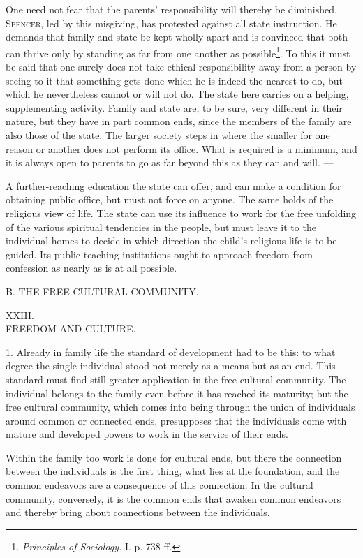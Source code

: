 \documentclass[12pt,a4paper,openany]{book}
\newcommand{\opage}[1]{\marginnote{\footnotesize\textit{[#1]}}}
\newcommand{\grouphead}[1]{\bigskip\begin{center}{\large #1}\end{center}}
\newcounter{etikch}
\newcommand{\chapterhead}[2]{\stepcounter{etikch}\bigskip\begin{center}\pdfbookmark[1]{#1 #2}{etikch.\arabic{etikch}}#1\\[3pt]{\large #2}\end{center}\medskip}
\begin{document}
One need not fear that the parents' responsibility will thereby be diminished. \textsc{Spencer}, led by this misgiving,
has protested against all state instruction. He
\opage{341}demands that family and state be kept wholly apart and is convinced that both can thrive only by standing as
far from one another as possible\footnote[1]{\textit{Principles of Sociology.} I. p. 738 ff.}. To this it must be said
that one surely does not take ethical responsibility away from a person by seeing to it that something gets done which
he is indeed the nearest to do, but which he nevertheless cannot or will not do. The state here carries on a helping,
supplementing activity. Family and state are, to be sure, very different in their nature, but they have in part common
ends, since the members of the family are also those of the state. The larger society steps in where the smaller for one
reason or another does not perform its office. What is required is a minimum, and it is always open to parents to go as
far beyond this as they can and will. ---

A further-reaching education the state can offer, and can make a condition for obtaining public office, but must not
force on anyone. The same holds of the religious view of life. The state can use its influence to work for the free
unfolding of the various spiritual tendencies in the people, but must leave it to the individual homes to decide in which
direction the child's religious life is to be guided. Its public teaching institutions ought to approach freedom from
confession as nearly as is at all possible.

\opage{342}\grouphead{B. THE FREE CULTURAL COMMUNITY.}

\chapterhead{XXIII.}{FREEDOM AND CULTURE.}

1. Already in family life the standard of development had to be this: to what degree the single individual stood not
merely as a means but as an end. This standard must find still greater application in the free cultural community. The
individual belongs to the family even before it has reached its maturity; but the free cultural community, which comes
into being through the union of individuals around common or connected ends, presupposes that the individuals come with
mature and developed powers to work in the service of their ends.

Within the family too work is done for cultural ends, but there the connection between the individuals is the first
thing, what lies at the foundation, and the common endeavors are a consequence of this connection. In the cultural
community, conversely, it is the common ends that awaken common endeavors and thereby bring about connections between
the individuals.
\end{document}
